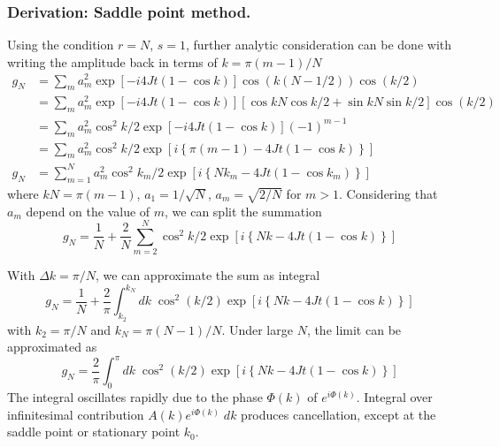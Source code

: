 \documentclass[../../../main.tex]{subfiles}
\begin{document}
\subsubsection{Derivation: Saddle point method.}
Using the condition $r=N$, $s=1$, further analytic consideration can be done with writing the amplitude back in terms of $k = \pi(m-1)/N$
\begin{align*}
  g_N
   & = \sum_{m } a_m ^ 2 \exp \left[ -i4Jt(1 - \cos k) \right] \cos (k(N-1/2)) \cos (k/2)                                     \\
   & = \sum_{m } a_m ^ 2 \exp \left[ -i4Jt(1 - \cos k) \right] \left[ \cos kN \cos k/2 + \sin kN \sin k/2 \right]  \cos (k/2) \\
   & = \sum_{m } a_m ^ 2\cos^2 k/2 \exp \left[ -i4Jt(1 - \cos k) \right](-1)^{m-1}                                            \\
   & = \sum_{m } a_m ^ 2\cos^2 k/2 \exp \left[i \left\{\pi(m-1) - 4Jt (1-\cos k)  \right\}  \right]                           \\
  g_N
   & = \sum_{m =1} ^{N} a_m ^ 2\cos^2 k_m/2 \exp \left[i \left\{Nk_m - 4Jt (1-\cos k_m)  \right\}  \right]
\end{align*}
where $kN = \pi (m-1)$, $a_1 = 1/\sqrt{N}$, $a_m = \sqrt{2/N}$ for $m>1$.
Considering that $a_m$ depend on the value of $m$, we can split the summation
\begin{equation*}
  g_N = \frac{1}{N} + \frac{2 }{N }\sum_{m=2 } ^{N} \cos^2 k/2 \exp \left[i \left\{Nk - 4Jt (1-\cos k)  \right\}  \right]
\end{equation*}

With $\Delta k = \pi /N$, we can approximate the sum as integral
\begin{equation*}
  g_N = \frac{1 }{N} +  \frac{2}{\pi}\int_{k_2} ^{k_N} dk\;  \cos^2 (k/2) \exp \left[i \left\{Nk - 4Jt (1-\cos k)  \right\}  \right]
\end{equation*}
with  $k_\text{2} = \pi/N$ and $k_N = \pi(N-1)/N$.
Under large $N$, the limit can be approximated as
\begin{equation*}
  g_N = \frac{2}{\pi} \int_{0} ^{\pi} dk\; \cos^2 (k/2) \exp \left[i \left\{Nk - 4Jt (1-\cos k)  \right\}  \right]
\end{equation*}
The  integral oscillates rapidly due to the phase $\Phi(k) $ of $e ^{i\Phi(k)}$.
Integral over infinitesimal contribution $A(k) e ^{i \Phi(k)} \;dk$ produces cancellation, except at the saddle point or stationary point $k_0$.
\end{document}
